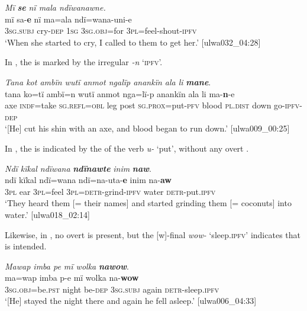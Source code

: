 \ea%
    \label{ex:verbs:66}
          \textit{Mï} \textbf{\textit{se}} \textit{nï mala ndïwanawne.}\\
\gll    mï       sa-\textbf{e}     nï     ma=ala     ndï=wana-uni-e\\
    3\textsc{sg.subj}  cry-\textsc{dep}  \textsc{1sg}  \textsc{3sg.obj=}for  3\textsc{pl}=feel-shout-\textsc{ipfv}\\
\glt `When she started to cry, I called to them to get her.’ [ulwa032\_04:28]
\z

In , the   is marked by the irregular   \textit{{}-n} ‘\textsc{ipfv}’.

\ea%
    \label{ex:verbs:67}

          \textit{Tana kot ambïn wutï anmot ngalïp anankïn ala li} \textbf{\textit{mane}}.\\
\gll tana  ko=tï    ambï=n    wutï  anmot  nga=lï-p anankïn  ala       li     ma-\textbf{n}{}-e\\
    axe    \textsc{indf}=take  \textsc{sg.refl=obl}  leg    post  \textsc{sg.prox}=put-\textsc{pfv}    blood    \textsc{pl.dist}  down  go-\textsc{ipfv-dep}\\


\glt `[He] cut his shin with an axe, and blood began to run down.’ [ulwa009\_00:25]
\z

In , the   is indicated by the    of the verb \textit{u-} ‘put’, without any overt .

\ea%
    \label{ex:verbs:68}
          \textit{Ndï kïkal ndïwana} \textbf{\textit{ndïnawte}} \textit{inim} \textbf{\textit{naw}}.\\
\gll ndï  kïkal  ndï=wana  ndï=na-uta-\textbf{e}       inim   na{}-\textbf{aw}\\
    3\textsc{pl}  ear    3\textsc{pl}=feel  3\textsc{pl}=\textsc{detr}{}-grind-\textsc{ipfv}  water  \textsc{detr}{}-put.\textsc{ipfv}\\
\glt `They heard them [= their names] and started grinding them [= coconuts] into water.’ [ulwa018\_02:14]
\z

Likewise, in , no overt  is present, but the [w]-final  \textit{wow-} ‘sleep.\textsc{ipfv}’ indicates that   is intended.

\ea%
    \label{ex:verbs:69}
          \textit{Mawap imba pe mï wolka} \textbf{\textit{nawow}}.\\
\gll ma=wap       imba  p-e   mï       wolka  na-\textbf{wow}\\
    3\textsc{sg.obj}=be.\textsc{pst}  night  be\textsc{{}-dep} 3\textsc{sg.subj}  again  \textsc{detr-}sleep.\textsc{ipfv}\\
\glt `[He] stayed the night there and again he fell asleep.’ [ulwa006\_04:33]
\z

